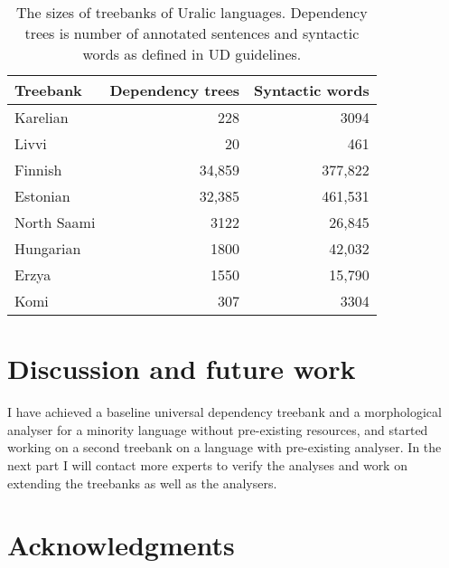 \documentclass{flammie}
\newif\ifcameraready%
\begin{document}
\begin{table}
    \begin{centering}
    \begin{tabular}{lrr}
        \toprule
        Treebank & Dependency trees & Syntactic words\\
        \midrule
        Karelian & 228 & 3094 \\
        Livvi & 20 & 461 \\
        \midrule
        Finnish & 34,859 & 377,822 \\
        Estonian & 32,385 & 461,531 \\
        North Saami & 3122 & 26,845 \\
        Hungarian & 1800 & 42,032 \\
        Erzya & 1550 & 15,790 \\
        Komi & 307 & 3304 \\
        \bottomrule
    \end{tabular}
    \caption{The sizes of treebanks of Uralic languages.
        Dependency trees is number of annotated sentences and syntactic words
        as defined in UD guidelines.\label{table:stats}}
    \end{centering}
\end{table}

\section{Discussion and future work}
\label{sec:discussion}

I have achieved a baseline universal dependency treebank and a morphological
analyser for a minority language without pre-existing resources, and started
working on a second treebank on a language with pre-existing analyser. In the
next part I will contact more experts to verify the analyses and work on
extending the treebanks as well as the analysers.

\section{Acknowledgments}
\label{sec:acknowledgments}

\ifcameraready%
The author was employed by CLARIN-D during the project.
\fi




\ifcameraready%
\author{Tommi A Pirinen \\
  Universität Hamburg \\
  Max-Brauer-Allee 60 \\
  D-22765, Hamburg  \\
  \texttt{tommi.antero.pirinen@uni-hamburg.de} \\}
  \fi
\end{document}
